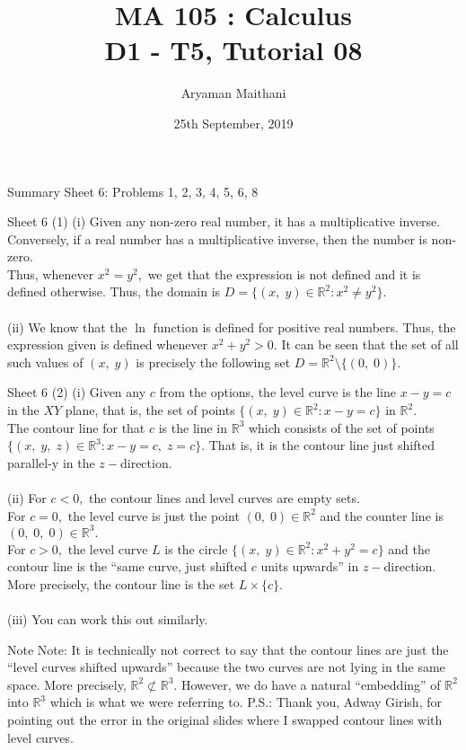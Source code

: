 \documentclass[handout, aspectratio=169]{beamer}
\title{MA 105 : Calculus\\ D1 - T5, Tutorial 08}  %
\author{Aryaman Maithani}
\date[25-09-2019]{25th September, 2019}               %
\institute[IITB]{IIT Bombay}
\begin{document}
\begin{frame}
	\titlepage
\end{frame}
\begin{frame}{Summary} 
	Sheet 6: Problems 1, 2, 3, 4, 5, 6, 8
\end{frame}
\begin{frame}{Sheet 6}                            %
	(1) (i) Given any non-zero real number, it has a multiplicative inverse. Conversely, if a real number has a multiplicative inverse, then the number is non-zero.\\
	Thus, whenever $x^2 = y^2,$ we get that the expression is not defined and it is defined otherwise. Thus, the domain is $D = \{(x,\;y) \in \mathbb{R}^2 : x^2 \neq y^2\}.$\\~\\
	(ii) We know that the $\ln$ function is defined for positive real numbers. Thus, the expression given is defined whenever $x^2 + y^2 > 0.$ It can be seen that the set of all such values of $(x,\;y)$ is precisely the following set $D = \mathbb{R}^2\setminus\{(0,\;0)\}.$
\end{frame}
\begin{frame}{Sheet 6}
	(2) (i) Given any $c$ from the options, the level curve is the line $x - y = c$ in the $XY$ plane, that is, the set of points $\{(x,\;y) \in \mathbb{R}^2 : x - y = c\}$ in $\mathbb{R}^2.$\\
	The contour line for that $c$ is the line in $\mathbb{R}^3$ which consists of the set of points $\{(x,\;y,\;z)\in\mathbb{R}^3 : x - y = c,\;z = c\}.$ That is, it is the contour line just shifted parallel-y in the $z-$direction.\\~\\
	(ii) For $c < 0,$ the contour lines and level curves are empty sets.\\
	For $c = 0,$ the level curve is just the point $(0,\;0)\in \mathbb{R}^2$ and the counter line is $(0,\;0,\;0)\in \mathbb{R}^3.$\\
	For $c > 0,$ the level curve $L$ is the circle $\{(x,\;y)\in\mathbb{R}^2:x^2 + y^2 = c\}$ and the contour line is the ``same curve, just shifted $c$ units upwards'' in $z-$direction. More precisely, the contour line is the set $L \times \{c\}.$\\~\\
	(iii) You can work this out similarly.\\
\end{frame}
	
\begin{frame}{Note}
	Note: It is technically not correct to say that the contour lines are just the ``level curves shifted upwards'' because the two curves are not lying in the same space. More precisely, $\mathbb{R}^2 \not\subset \mathbb{R}^3.$ However, we do have a natural ``embedding'' of $\mathbb{R}^2$ into $\mathbb{R}^3$ which is what we were referring to.
	\vfill
	P.S.: Thank you, Adway Girish, for pointing out the error in the original slides where I swapped contour lines with level curves.
\end{frame}
\end{document}
